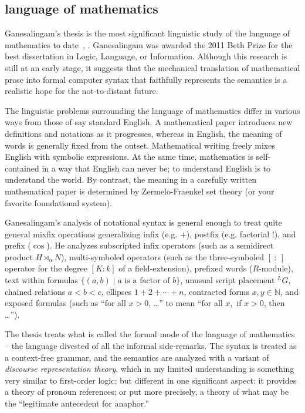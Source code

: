 \documentclass{llncs}
\newcommand{\ring}[1]{\mathbb{#1}}
\begin{document}
\subsection{language of mathematics}


Ganesalingam's thesis is the most significant linguistic study of the
language of mathematics to date~\cite{Gan09}, \cite{Gan10}.
Ganesalingam was awarded the 2011 Beth Prize for the best dissertation
in Logic, Language, or Information.  Although this research is still
at an early stage, it suggests that the mechanical translation of
mathematical prose into formal computer syntax that faithfully
represents the semantics is a realistic hope for the not-to-distant
future.



The linguistic problems surrounding the language of mathematics differ
in various ways from those of say standard English.  A mathematical
paper introduces new definitions and notations as it progresses,
whereas in English, the meaning of words is generally fixed from the
outset.  Mathematical writing freely mixes English with symbolic
expressions.  At the same time, mathematics is self-contained in a way
that English can never be; to understand English is to understand the
world.  By contrast, the meaning in a carefully written mathematical
paper is determined by Zermelo-Fraenkel set theory (or your favorite
foundational system).

Ganesalingam's analysis of notational syntax is general enough to
treat quite general mixfix operations generalizing infix (e.g. +),
postfix (e.g. factorial !), and prefix ($\cos$).  He analyzes
subscripted infix operators (such as a semidirect product
$H\rtimes_\alpha N$), multi-symboled operators (such as the
three-symboled $[~:~]$ operator for the degree $[K:k]$ of a
field-extension), prefixed words ($R$-module), text within formulas
$\{(a,b) \mid a \text{~is a factor of~} b\}$, unusual script placement
${}^LG$, chained relations $a<b<c$, ellipses $1+2+\cdots+n$,
contracted forms $x,y\in\ring{N}$, and exposed formulas (such as ``for
all $x>0$, \dots'' to mean ``for all $x$,~if $x>0$, then \dots'').

The thesis treats what is called the formal mode of the language of
mathematics -- the language divested of all the informal side-remarks.
The syntax is treated as a context-free grammar, and the semantics are
analyzed with a variant of {\it discourse representation theory},
which in my limited understanding is something very similar to
first-order logic; but different in one significant aspect: it
provides a theory of pronoun references; or put more precisely, a
theory of what may be the ``legitimate antecedent for anaphor.''
\end{document}
